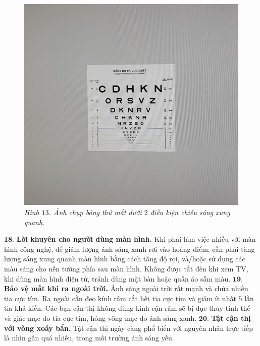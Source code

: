 \begin{multicols}{2}
\begin{figure}[H]
		\vspace*{2pt}
		\includegraphics[width= 1\linewidth]{13b}
		\caption{\small\textit{\color{timhieukhoahoc}Hình $13$. Ảnh chụp bảng thử mắt dưới $2$ điều kiện chiếu sáng xung quanh.}}
		\vspace*{-10pt}
	\end{figure}
	$\pmb{18.}$ \textbf{\color{timhieukhoahoc}Lời khuyên cho người dùng màn hình.} 
	\vskip 0.1cm
	Khi phải làm việc nhiều với màn hình công nghệ, để giảm lượng ánh sáng xanh rơi vào hoàng điểm, cần phải tăng lượng sáng xung quanh màn hình bằng cách tăng độ rọi, và/hoặc sử dụng các màu sáng cho nền tường phía sau màn hình.
	\vskip 0.1cm
	Không được tắt đèn khi xem TV, khi dùng màn hình điện tử, tránh dùng mặt bàn hoặc quần áo sẫm màu.
	\vskip 0.1cm
	$\pmb{19.}$ \textbf{\color{timhieukhoahoc}Bảo vệ mắt khi ra ngoài trời.}
	\vskip 0.1cm
	Ánh sáng ngoài trời rất mạnh và chứa nhiều tia cực tím. Ra ngoài cần đeo kính râm cắt hết tia cực tím và giảm ít nhất $5$ lần tia khả kiến. Các bạn cận thị không dùng kính cận râm sẽ bị đục thủy tinh thể và giác mạc do tia cực tím, hỏng võng mạc do ánh sáng xanh. 
	\vskip 0.1cm
	$\pmb{20.}$ \textbf{\color{timhieukhoahoc}Tật cận thị với vòng xoáy bẩn.}
	\vskip 0.1cm
	Tật cận thị ngày càng phổ biến với nguyên nhân trực tiếp là nhìn gần quá nhiều, trong môi trường ánh sáng yếu.
	\begin{figure}[H]
		\vspace*{-5pt}

\end{figure}
\end{multicols}
